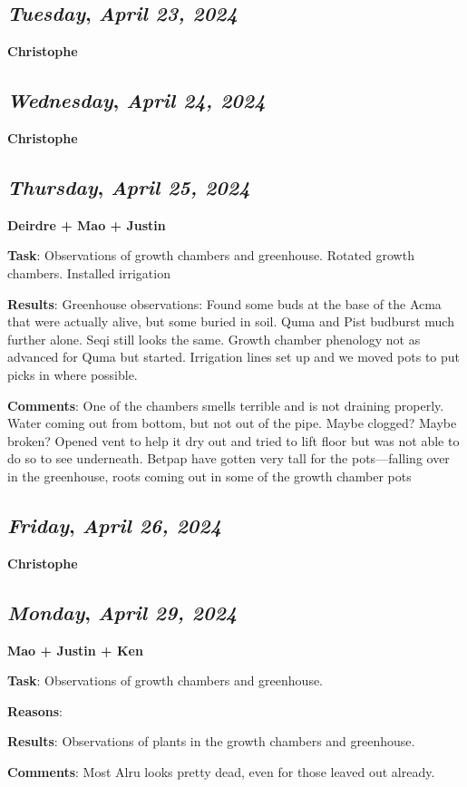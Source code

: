 \def\day{\textit{April 23, 2024}}
\def\weekday{\textit{Tuesday}}
\subsection*{\weekday, \day}
\textbf {Christophe}

\def\day{\textit{April 24, 2024}}
\def\weekday{\textit{Wednesday}}
\subsection*{\weekday, \day}
\textbf {Christophe}

\def\day{\textit{April 25, 2024}}
\def\weekday{\textit{Thursday}}
\subsection*{\weekday, \day}
\textbf {Deirdre + Mao + Justin}
\par 
\textbf {Task}: Observations of growth chambers and greenhouse. Rotated growth chambers. Installed irrigation
\par 
\textbf {Results}: Greenhouse observations: Found some buds at the base of the Acma that were actually alive, but some buried in soil. Quma and Pist budburst much further alone. Seqi still looks the same. Growth chamber phenology not as advanced for Quma but started. Irrigation lines set up and we moved pots to put picks in where possible.
\par 
\textbf {Comments}: One of the chambers smells terrible and is not draining properly. Water coming out from bottom, but not out of the pipe. Maybe clogged? Maybe broken? Opened vent to help it dry out and tried to lift floor but was not able to do so to see underneath. Betpap have gotten very tall for the pots---falling over in the greenhouse, roots coming out in some of the growth chamber pots

\def\day{\textit{April 26, 2024}}
\def\weekday{\textit{Friday}}
\subsection*{\weekday, \day}
\textbf {Christophe}

\def\day{\textit{April 29, 2024}}
\def\weekday{\textit{Monday}}
\subsection*{\weekday, \day}
\textbf {Mao + Justin + Ken}
\par 
\textbf {Task}: Observations of growth chambers and greenhouse.
\par 
\textbf {Reasons}: 
\par 
\textbf {Results}: Observations of plants in the growth chambers and greenhouse.
\par 
\textbf {Comments}: Most Alru looks pretty dead, even for those leaved out already.


